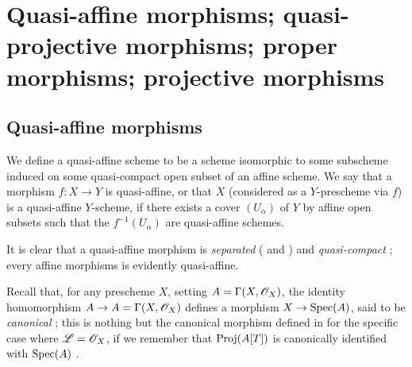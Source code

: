 \section{Quasi-affine morphisms; quasi-projective morphisms; proper morphisms; projective morphisms}
\label{section:II.5}

\subsection{Quasi-affine morphisms}
\label{subsection:II.5.1}

\begin{definition}[5.1.1]
\label{II.5.1.1}
We define a quasi-affine scheme to be a scheme isomorphic to some subscheme induced on some quasi-compact open subset of an affine scheme.
We say that a morphism $f:X\to Y$ is quasi-affine, or that $X$ (considered as a $Y$-prescheme via $f$) is a quasi-affine $Y$-scheme, if there exists a cover $(U_\alpha)$ of $Y$ by affine open subsets such that the $f^{-1}(U_\alpha)$ are quasi-affine schemes.
\end{definition}

It is clear that a quasi-affine morphism is \emph{separated} ( and ) and \emph{quasi-compact} ;
every affine morphisms is evidently quasi-affine.

Recall that, for any prescheme $X$, setting $A=\Gamma(X,\mathscr{O}_X)$, the identity homomorphism $A\to A=\Gamma(X,\sh{O}_X)$ defines a morphism $X\to\Spec(A)$, said to be \emph{canonical} ;
this is nothing but the canonical morphism defined in  for the specific case where $\mathscr{L}=\mathscr{O}_X$, if we remember that $\operatorname{Proj}(A[T])$ is canonically identified with $\operatorname{Spec}(A)$ .

